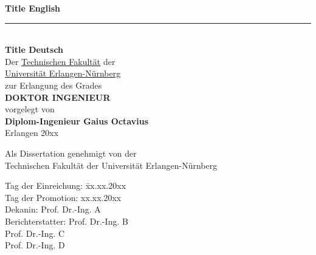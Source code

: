 \documentclass[12pt,a4paper]{scrreprt}
\newcommand{\HRule}{\rule{\linewidth}{1.4mm}}
\begin{document}
	
\areaset[20mm]{165.0mm}{233.36mm}
\pagestyle{plain}
\thispagestyle{empty}
\begin{titlepage}\centering
  \begingroup
  {\os\huge\bfseries Title English\\[3mm]}
  \HRule\\
  {\huge\bfseries\textgerman{\os Title Deutsch}\\[6.0cm]}
  {\large Der \href{http://www.techfak.uni-erlangen.de/}{Technischen Fakult\"at} der\\\href{http://www.uni-erlangen.de/}{Universit\"at Erlangen-N\"urnberg}\\zur Erlangung des Grades\\[0.7cm]}
  {\os\large\bfseries DOKTOR INGENIEUR\\[0.7cm]}
  {\large vorgelegt von\\[0.5cm]}
  {\os\large\bfseries Diplom-Ingenieur Gaius Octavius\\[0.5cm]}
  {\large Erlangen 20xx\\}
  \endgroup
\end{titlepage}

\areaset[20mm]{157.5mm}{222.75mm}
\thispagestyle{empty}
\begingroup
\begin{center}
Als Dissertation genehmigt von der\\[2mm]
Technischen Fakult\"at der Universit\"at Erlangen-N\"urnberg\\[1cm]
\end{center}
\begin{tabbing}
Tag der Einreichung: \= xx.xx.20xx\\[2mm]
Tag der Promotion:   \> xx.xx.20xx\\[2mm]
Dekanin:             \> Prof. Dr.-Ing. A\\[2mm]
Berichterstatter:    \> Prof. Dr.-Ing. B\\[2mm]
                     \> Prof. Dr.-Ing. C\\[2mm]
					 \> Prof. Dr.-Ing. D
\end{tabbing}
\endgroup
\pagebreak


	


\end{document}

